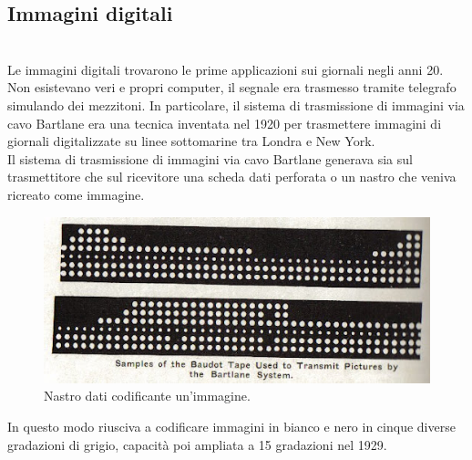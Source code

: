 \subsection{Immagini digitali}
\cite{storia}\\
Le immagini digitali trovarono le prime applicazioni sui giornali negli anni 20. Non esistevano veri e propri computer, il segnale era trasmesso tramite telegrafo simulando dei mezzitoni.
In particolare, il sistema di trasmissione di immagini via cavo Bartlane era una tecnica inventata nel 1920 per trasmettere immagini di giornali digitalizzate su linee sottomarine tra Londra e New York.\\
Il sistema di trasmissione di immagini via cavo Bartlane generava sia sul trasmettitore che sul ricevitore una scheda dati perforata o un nastro che veniva ricreato come immagine.\\

\begin{figure}[htb] \centering
\includegraphics[scale=0.7, trim = 0 1.1cm 0 0, clip]{Pictures/nastro Bartlane.jpg}
\caption{Nastro dati codificante un'immagine.}\label{fig:figura}
\end{figure}


In questo modo riusciva a codificare immagini in bianco e nero in cinque diverse gradazioni di grigio, capacità poi ampliata a 15 gradazioni nel 1929.

